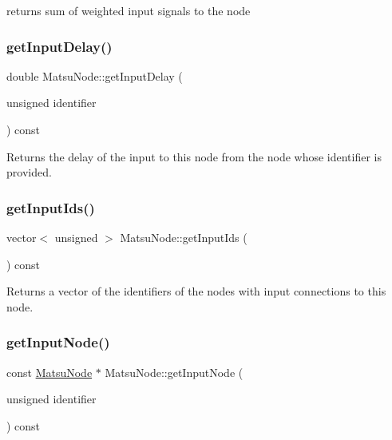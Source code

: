 returns sum of weighted input signals to the node 

\mbox{\label{classMatsuNode_a834a92cc0cb855666c9df1a679f461e4}} 
\subsubsection{\texorpdfstring{get\+Input\+Delay()}{getInputDelay()}}
{\footnotesize\ttfamily double Matsu\+Node\+::get\+Input\+Delay (\begin{DoxyParamCaption}\item[{unsigned}]{identifier }\end{DoxyParamCaption}) const}



Returns the delay of the input to this node from the node whose identifier is provided. 

\mbox{\label{classMatsuNode_a79c07be1208645ebf5b18677afc47c9f}} 
\subsubsection{\texorpdfstring{get\+Input\+Ids()}{getInputIds()}}
{\footnotesize\ttfamily vector$<$ unsigned $>$ Matsu\+Node\+::get\+Input\+Ids (\begin{DoxyParamCaption}{ }\end{DoxyParamCaption}) const}



Returns a vector of the identifiers of the nodes with input connections to this node. 

\mbox{\label{classMatsuNode_a4669072fc04e1bcfc8561c52af04abbf}} 
\subsubsection{\texorpdfstring{get\+Input\+Node()}{getInputNode()}}
{\footnotesize\ttfamily const \mbox{\hyperlink{classMatsuNode}{Matsu\+Node}} $\ast$ Matsu\+Node\+::get\+Input\+Node (\begin{DoxyParamCaption}\item[{unsigned}]{identifier }\end{DoxyParamCaption}) const}



